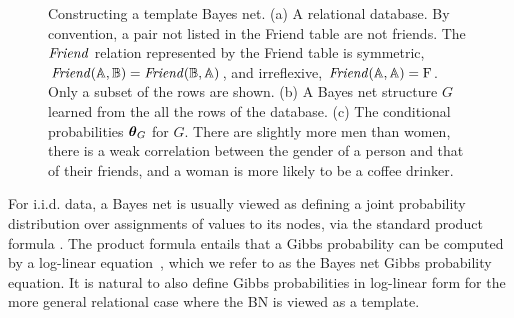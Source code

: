 \documentclass[twoside,11pt]{article}
\newcommand{\iid}{i.i.d.}
\begin{document}
\begin{figure}[htbp]
\begin{center}
\caption{Constructing a template Bayes net. (a) A relational database. By convention, a pair not listed in the Friend table are not friends. The $\it{Friend}$ relation represented by the Friend table is symmetric, $\it{Friend}(\mathbb{A},\mathbb{B}) = \it{Friend}(\mathbb{B},\mathbb{A})$, and irreflexive,
$\it{Friend}(\mathbb{A}, \mathbb{A}) = \mathrm{F}$.
Only a subset of the rows are shown. 
(b) A Bayes net structure $G$ learned from the all the rows of the database.
(c) The conditional probabilities $\boldsymbol{\theta}_G$ for $G$. There are slightly more men than women, there is a weak correlation between the gender of a person and that of their friends, and a woman is more likely to be a coffee drinker. 
}
\label{fig:pbn}
\end{center}
\end{figure}


For \iid{} data, a Bayes net is usually viewed as defining a joint probability distribution over assignments of values to its nodes, via the standard product formula \cite{Pearl1988}. The product formula entails that a Gibbs probability can be computed by a log-linear equation~\cite[Ch.14.5.2]{Russell2010}, which we refer to as the Bayes net Gibbs probability equation.
It is natural to also define Gibbs probabilities in log-linear form for the more general relational case where the BN is viewed as a template. 
\end{document}
